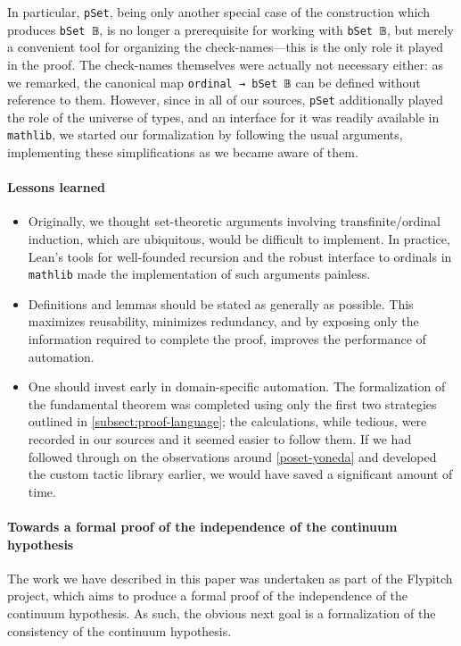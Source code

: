 \documentclass[a4paper,USenglish,cleveref, autoref]{lipics-v2019}
\newcommand{\lil}{\lstinline}
\theoremstyle{definition}
\begin{document}
In particular, \lstinline{pSet}, being only another special case of the construction which produces \lstinline{bSet 𝔹}, is no longer a prerequisite for working with \lstinline{bSet 𝔹}, but merely a convenient tool for organizing the check-names---this is the only role it played in the proof. The check-names themselves were actually not necessary either: as we remarked, the canonical map \lil{ordinal → bSet 𝔹} can be defined without reference to them. However, since in all of our sources, \lstinline{pSet} additionally played the role of the universe of types, and an interface for it was readily available in \lstinline{mathlib}, we started our formalization by following the usual arguments, implementing these simplifications as we became aware of them.
\paragraph*{Lessons learned}
\begin{itemize}
\item Originally, we thought set-theoretic arguments involving transfinite/ordinal induction, which are ubiquitous, would be difficult to implement. In practice, Lean's tools for well-founded recursion and the robust interface to ordinals in \lstinline{mathlib} made the implementation of such arguments painless.
\item Definitions and lemmas should be stated as generally as possible. This maximizes reusability, minimizes redundancy, and by exposing only the information required to complete the proof, improves the performance of automation.

\item One should invest early in domain-specific automation. The formalization of the fundamental theorem was completed using only the first two strategies outlined in \autoref{subsect:proof-language}; the calculations, while tedious, were recorded in our sources and it seemed easier to follow them. If we had followed through on the observations around \autoref{poset-yoneda} and developed the custom tactic library earlier, we would have saved a significant amount of time.
\end{itemize}

\paragraph*{Towards a formal proof of the independence of the continuum hypothesis}

The work we have described in this paper was undertaken as part of the Flypitch project, which aims to produce a formal proof of the independence of the continuum hypothesis. As such, the obvious next goal is a formalization of the consistency of the continuum hypothesis.
\end{document}
